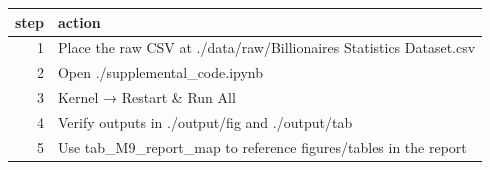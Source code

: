 \begin{tabular}{rl}
\toprule
step & action \\
\midrule
1 & Place the raw CSV at ./data/raw/Billionaires Statistics Dataset.csv \\
2 & Open ./supplemental\_code.ipynb \\
3 & Kernel → Restart \& Run All \\
4 & Verify outputs in ./output/fig and ./output/tab \\
5 & Use tab\_M9\_report\_map to reference figures/tables in the report \\
\bottomrule
\end{tabular}
